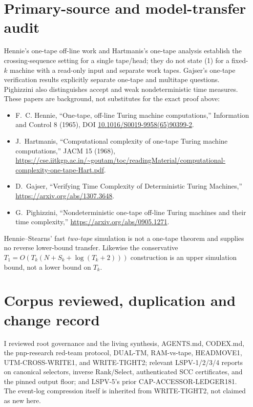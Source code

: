 \documentclass[11pt]{article}
\begin{document}
\section{Primary-source and model-transfer audit}
Hennie's one-tape off-line work and Hartmanis's one-tape analysis establish the
crossing-sequence setting for a single tape/head; they do not state (1) for a
fixed-$k$ machine with a read-only input and separate work tapes.  Gajser's
one-tape verification results explicitly separate one-tape and multitape
questions.  Pighizzini also distinguishes accept and weak nondeterministic time
measures.  These papers are background, not substitutes for the exact proof
above:
\begin{itemize}
\item F.~C. Hennie, ``One-tape, off-line Turing machine computations,''
Information and Control 8 (1965), DOI
\href{https://doi.org/10.1016/S0019-9958(65)90399-2}{10.1016/S0019-9958(65)90399-2}.
\item J.~Hartmanis, ``Computational complexity of one-tape Turing machine
computations,'' JACM 15 (1968),
\url{https://cse.iitkgp.ac.in/~goutam/toc/readingMaterial/computational-complexity-one-tape-Hart.pdf}.
\item D.~Gajser, ``Verifying Time Complexity of Deterministic Turing Machines,''
\url{https://arxiv.org/abs/1307.3648}.
\item G.~Pighizzini, ``Nondeterministic one-tape off-line Turing machines and
their time complexity,'' \url{https://arxiv.org/abs/0905.1271}.
\end{itemize}
Hennie--Stearns' fast \emph{two-tape} simulation is not a one-tape theorem and
supplies no reverse lower-bound transfer.  Likewise the conservative
$T_1=O(T_k(N+S_k+\log(T_k+2)))$ construction is an upper simulation bound, not
a lower bound on $T_k$.

\section{Corpus reviewed, duplication and change record}
I reviewed root governance and the living synthesis, AGENTS.md, CODEX.md, the
pnp-research red-team protocol, DUAL-TM, RAM-vs-tape, HEADMOVE1,
UTM-CROSS-WRITE1, and WRITE-TIGHT2; relevant LSPV-1/2/3/4 reports on canonical
selectors, inverse Rank/Select, authenticated SCC certificates, and the pinned
output floor; and LSPV-5's prior CAP-ACCESSOR-LEDGER181.  The event-log
compression itself is inherited from WRITE-TIGHT2, not claimed as new here.
\end{document}
